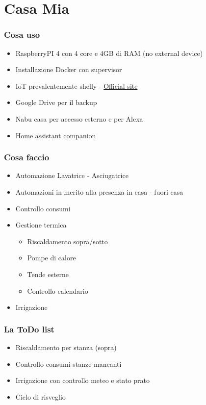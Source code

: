 \documentclass[hyperref={pdfpagelabels=false}]{beamer}
\begin{document}
	\section{Casa Mia}
	\begin{frame}
	\frametitle{Cosa uso}
	\begin{itemize}
		\item RaspberryPI 4 con 4 core e 4GB di RAM (no external device)
		\item Installazione Docker con supervisor
		\item IoT prevalentemente shelly -  \href{https://shelly.cloud/}{Official site}
		\item Google Drive per il backup
		\item Nabu casa per accesso esterno e per Alexa
		\item Home assistant companion
	\end{itemize}
	\end{frame}

	\begin{frame}
	\frametitle{Cosa faccio}
	\begin{itemize}
		\item Automazione Lavatrice - Asciugatrice
		\item Automazioni in merito alla presenza in casa - fuori casa
		\item Controllo consumi
		\item Gestione termica
		\begin{itemize}
			\item Riscaldamento sopra/sotto
			\item Pompe di calore
			\item Tende esterne
			\item Controllo calendario
		\end{itemize}
		\item Irrigazione
	\end{itemize}
	\end{frame}

	\begin{frame}
	\frametitle{La ToDo list}
	\begin{itemize}
		\item Riscaldamento per stanza (sopra)
		\item Controllo consumi stanze mancanti
		\item Irrigazione con controllo meteo e stato prato
		\item Ciclo di risveglio
	\end{itemize}
	\end{frame}
\end{document}

